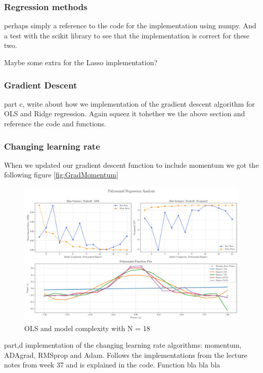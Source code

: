 \documentclass[amssymb,twocolumn,aps]{revtex4}
\begin{document}
\subsubsection{Regression methods}

perhaps simply a reference to the code for the implementation using numpy.
And a test with the scikit library to see that the implementation is correct for these two.

Maybe some extra for the Lasso implementation?

\subsubsection{Gradient Descent}
part c, write about how we implementation of the gradient descent algorithm for OLS and Ridge regression.
Again squeez it tohether we the above section and reference the code and functions.

\subsubsection*{Changing learning rate}

When we updated our gradient descent function to include momentum we got the following figure \ref{fig:GradMomentum} 


\begin{figure}[t]
    \centering
    \includegraphics[width=.95 \textwidth]{Figures/Combined_Analysis_OLS.png}
    \caption{OLS and model complexity with N = 18}
    \label{fig:OLS1}
\end{figure}



part,d implementation of the changing learning rate algorithms: momentum, ADAgrad, RMSprop and Adam.
Follows the implementations from the lecture notes from week 37 \cite{compfys} and is explained in the code.
Function  bla bla bla
\end{document}
